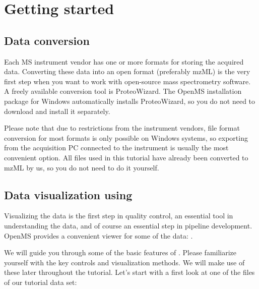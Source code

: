 
\setcounter{equation}{0}

\section{Getting started}

\subsection{Data conversion}
\label{Data_Conversion}

Each MS instrument vendor has one or more formats for storing the acquired data. Converting these data into an open format (preferably mzML) is the very first step when you want to work with open-source mass spectrometry software. A freely available conversion tool is ProteoWizard. The OpenMS installation package for Windows automatically installs ProteoWizard, so you do not need to download and install it separately.

Please note that due to restrictions from the instrument vendors, file format conversion for most formats is only possible on Windows systems, so exporting from the acquisition PC connected to the instrument is usually the most convenient option.
All files used in this tutorial have already been converted to mzML by us, so you do not need to do it yourself.


\subsection{Data visualization using }
\label{Data_Visualization}

Visualizing the data is the first step in quality control, an essential tool in understanding the data, and of course an essential step in pipeline development.
OpenMS provides a convenient viewer for some of the data: .

We will guide you through some of the basic features of . Please familiarize yourself with the key controls and visualization methods.
We will make use of these later throughout the tutorial. Let's start with a first look at one of the files of our tutorial data set:

